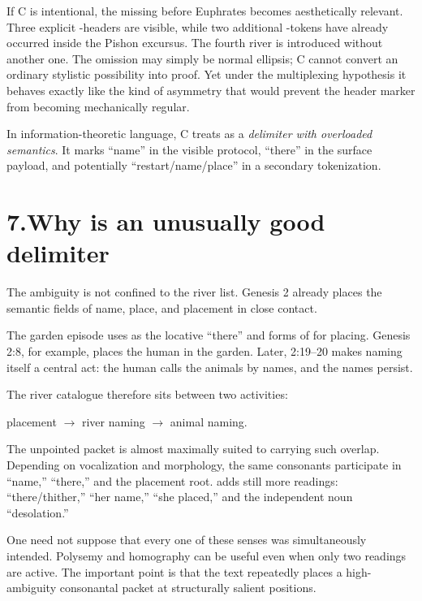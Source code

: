 If C is intentional, the missing  before Euphrates becomes aesthetically relevant.  Three explicit -headers are visible, while two additional -tokens have already occurred inside the Pishon excursus.  The fourth river is introduced without another one.  The omission may simply be normal ellipsis; C cannot convert an ordinary stylistic possibility into proof.  Yet under the multiplexing hypothesis it behaves exactly like the kind of asymmetry that would prevent the header marker from becoming mechanically regular.

In information-theoretic language, C treats  as a \emph{delimiter with overloaded semantics}.  It marks ``name'' in the visible protocol, ``there'' in the surface payload, and potentially ``restart/name/place'' in a secondary tokenization.

\section*{7.\quad Why  is an unusually good delimiter}

The ambiguity is not confined to the river list.  Genesis 2 already places the semantic fields of name, place, and placement in close contact.

The garden episode uses  as the locative ``there'' and forms of  for placing.  Genesis 2:8, for example, places the human in the garden.  Later, 2:19--20 makes naming itself a central act: the human calls the animals by names, and the names persist.

The river catalogue therefore sits between two activities:

\begin{center}
placement \qquad $\rightarrow$ \qquad river naming \qquad $\rightarrow$ \qquad animal naming.
\end{center}

The unpointed packet  is almost maximally suited to carrying such overlap.  Depending on vocalization and morphology, the same consonants participate in ``name,'' ``there,'' and the placement root.   adds still more readings: ``there/thither,'' ``her name,'' ``she placed,'' and the independent noun ``desolation.''

One need not suppose that every one of these senses was simultaneously intended.  Polysemy and homography can be useful even when only two readings are active.  The important point is that the text repeatedly places a high-ambiguity consonantal packet at structurally salient positions.


